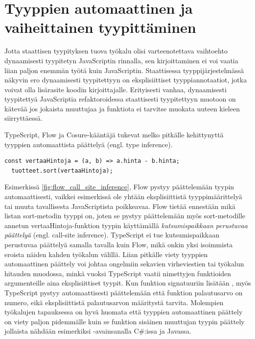 \section{Tyyppien automaattinen ja vaiheittainen tyypittäminen}

Jotta staattisen tyypityksen tuova työkalu olisi varteenotettava vaihtoehto
dynaamisesti tyypitetyn JavaScriptin rinnalla, sen kirjoittaminen ei voi vaatia
liian paljon enemmän työtä kuin JavaScriptin. Staattisessa tyyppijärjestelmässä
näkyvin ero dynaamisesti tyypitettyyn on eksplisiittiset tyyppiannotaatiot,
jotka voivat olla lisärasite koodin kirjoittajalle. Erityisesti vanhaa,
dynaamisesti tyypitettyä JavaScriptia refaktoroidessa staattisesti tyypitettyyn
muotoon on kätevää jos jokaista muuttujaa ja funktiota ei tarvitse muokata
uuteen kieleen siirryttäessä.

TypeScript, Flow ja Cosure-kääntäjä tukevat melko pitkälle kehittynyttä
tyyppien automaattista päättelyä (engl. type inference).
\begin{lstlisting}[caption={
  Flow pystyy tulkitsemaan vertaaHintoja-funktion tyypin automaattisesti, ilman eksplisiittisiä tyyppimäärittelyitä.
  },
  label={fig:flow_call_site_inference},
  aboveskip={20pt}
]
  const vertaaHintoja = (a, b) => a.hinta - b.hinta;
  tuotteet.sort(vertaaHintoja);
\end{lstlisting}
Esimerkissä \ref{fig:flow_call_site_inference}, Flow pystyy päättelemään
tyypin \newline
{} automaattisesti,
vaikkei esimerkissä ole yhtään eksplisiittistä tyyppimäärittelyä tai
muuta tavallisesta JavaScriptista poikkeavaa. Flow tietää ennestään
mikä listan sort-metodin tyyppi on, joten se pystyy päättelemään myös
sort-metodille annetun vertaaHintoja-funktion tyypin käyttämällä
\textit{kutsumispaikkaan perustuvaa päättelyä} (engl. call-site inference).
TypeScript ei tue kutsumispaikkaan perustuvaa päättelyä samalla tavalla kuin
Flow, mikä onkin yksi isoimmista eroista näiden kahden työkalun välillä.
Liian pitkälle viety tyyppien automaattinen päättely voi johtaa ongelmiin
sekavien virheviestien tai työkalun hitauden muodossa, minkä vuoksi TypeScript
vaatii nimettyjen funktioiden argumenteille aina eksplisiittiset tyypit.
Kun funktion signatuuriin lisätään ,
myös TypeScript pystyy automaattisesti päättelemään että funktion palautusarvo
on numero, eikä eksplisiittistä  palautusarvon
määritystä tarvita.
Molempien työkalujen tapauksessa on hyvä huomata että tyyppien automaattinen
päättely on viety paljon pidemmälle kuin se funktion sisäinen muuttujan
tyypin päättely jollaista nähdään esimerkiksi
-avainsanalla C\#:issa ja Javassa.

